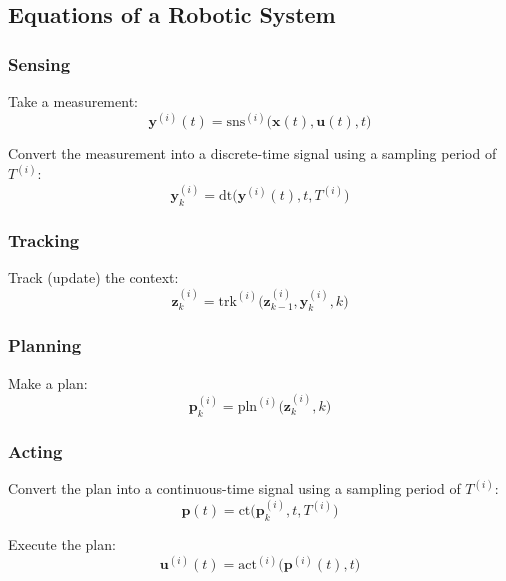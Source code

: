 \subsection{Equations of a Robotic System}

\subsubsection{Sensing}
\begin{definition}
    Take a measurement:
    \[
    \mathbf{y}^{(i)}(t) = \text{sns}^{(i)}\big(\mathbf{x}(t), \mathbf{u}(t), t\big)
    \]

    Convert the measurement into a discrete-time signal using a sampling period of \( T^{(i)} \):
    \[
    \mathbf{y}_k^{(i)} = \text{dt}\big(\mathbf{y}^{(i)}(t), t, T^{(i)}\big)
    \]
\end{definition}

\subsubsection{Tracking}
\begin{definition}
    Track (update) the context:
    \[
    \mathbf{z}_k^{(i)} = \text{trk}^{(i)}\big(\mathbf{z}_{k-1}^{(i)}, \mathbf{y}_k^{(i)}, k\big)
    \]
\end{definition}

\subsubsection{Planning}
\begin{definition}
    Make a plan:
    \[
    \mathbf{p}_k^{(i)} = \text{pln}^{(i)}\big(\mathbf{z}_k^{(i)}, k\big)
    \]
\end{definition}

\subsubsection{Acting}
\begin{definition}
    Convert the plan into a continuous-time signal using a sampling period of \( T^{(i)} \):
    \[
    \mathbf{p}(t) = \text{ct}\big(\mathbf{p}_k^{(i)}, t, T^{(i)}\big)
    \]

    Execute the plan:
    \[
    \mathbf{u}^{(i)}(t) = \text{act}^{(i)}\big(\mathbf{p}^{(i)}(t), t\big)
    \]
\end{definition}

